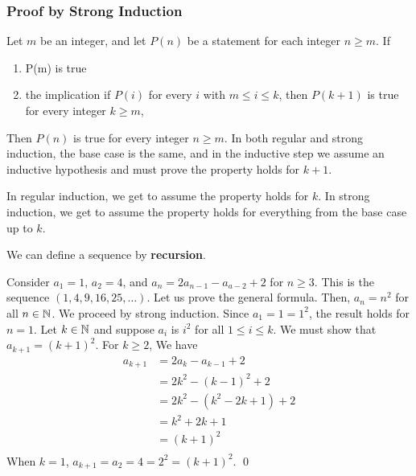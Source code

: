 \documentclass{article}
\begin{document}
\subsubsection{Proof by Strong Induction}
\begin{definition}
  Let $m$ be an integer, and let $P(n)$ be a statement for each integer $n \geq m$. If
  \begin{enumerate}
    \item P(m) is true
    \item the implication if $P(i)$ for every $i$ with $m \leq i \leq k$, then $P(k+1)$ is true for every integer $k \geq m$,
  \end{enumerate}
  Then $P(n)$ is true for every integer $n \geq m$.
  \newline
  In both regular and strong induction, the base case is the same, and in the inductive step we assume an inductive hypothesis and must prove the property holds for $k+1$.

  In regular induction, we get to assume the property holds for $k$. In strong induction, we get to assume the property holds for everything from the base case up to $k$.
\end{definition}
\begin{proposition}
  We can define a sequence by \textbf{recursion}.
\end{proposition}
\begin{example}
  Consider $a_1 = 1$, $a_2 = 4$, and $a_n = 2a_{n-1} -a_{a-2} + 2$ for $n \geq 3$. This is the sequence $(1, 4, 9, 16, 25, \ldots)$.
  Let us prove the general formula.
  Then, $a_n = n^2$ for all $n \in \mathbb{N}$.
  We proceed by strong induction. \newline
  Since $a_1 = 1 = 1^2$, the result holds for $n = 1$.\newline
  Let $k \in \mathbb{N}$ and suppose $a_i$ is $i^2$ for all $1 \leq i \leq k$.
  We must show that $a_{k+1} = (k+1)^2$. For $k \geq 2$, We have
  \begin{align*}
    a_{k+1} &=2a_k - a_{k-1} + 2\\
    &= 2k^2 - (k-1)^2 + 2 \tag{By our inductive hypothesis}\\
    &= 2k^2 - (k^2 - 2k + 1) + 2\\
    &= k^2 + 2k + 1\\
    &= (k+1)^2\\
  \end{align*}
  When $k = 1$, $a_{k+1} = a_2 = 4 = 2^2 = (k+1)^2$.
  \qed
\end{example}
\end{document}
